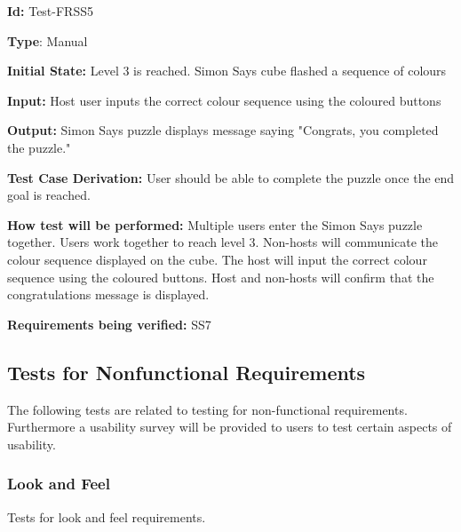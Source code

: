 \documentclass[12pt, titlepage]{article}
\begin{document}
\begin{enumerate}
\textbf{Id:} Test-FRSS5

\textbf{Type}: Manual

\textbf{Initial State:} Level 3 is reached. Simon Says cube flashed a sequence of colours

\textbf{Input:} Host user inputs the correct colour sequence using the coloured buttons

\textbf{Output:} Simon Says puzzle displays message saying "Congrats, you completed the puzzle."

\textbf{Test Case Derivation:} User should be able to complete the puzzle once the end goal is reached.

\textbf{How test will be performed:} Multiple users enter the Simon Says puzzle together. Users work together to reach level 3. Non-hosts will communicate the colour sequence displayed on the cube. The host will input the correct colour sequence using the coloured buttons. Host and non-hosts will confirm that the congratulations message is displayed.

\textbf{Requirements being verified: } SS7

\end{enumerate}



\subsection{Tests for Nonfunctional Requirements}



The following tests are related to testing for non-functional requirements. Furthermore a usability survey will be provided to users to test certain aspects of usability.

\subsubsection{Look and Feel}
Tests for look and feel requirements.
\end{document}
